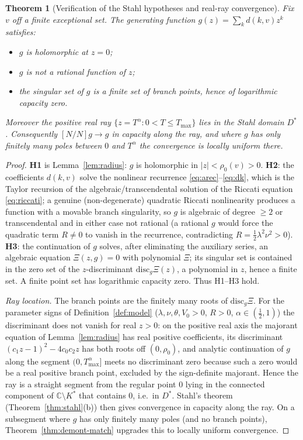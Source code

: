\documentclass[11pt]{article}
\newcommand{\C}{\mathbb{C}}
\theoremstyle{plain}
\newtheorem{theorem}{Theorem}[section]
\theoremstyle{definition}
\theoremstyle{remark}
\begin{document}
\begin{theorem}[Verification of the Stahl hypotheses and real-ray convergence]
\label{thm:stahl-ray}
Fix $v$ off a finite exceptional set. The generating function $g(z)=\sum_k
d(k,v)z^k$ satisfies:
\begin{itemize}[leftmargin=1.4em]
\item[\textbf{H1}] $g$ is holomorphic at $z=0$;
\item[\textbf{H2}] $g$ is not a rational function of $z$;
\item[\textbf{H3}] the singular set of $g$ is a finite set of branch points, hence
of logarithmic capacity zero.
\end{itemize}
Moreover the positive real ray $\{z=T^\alpha:0<T\le T_{\max}\}$ lies in the Stahl
domain $D^\ast$. Consequently $[N/N]g\to g$ in capacity along the ray, and where
$g$ has only finitely many poles between $0$ and $T^\alpha$ the convergence is
locally uniform there.
\end{theorem}
\begin{proof}
\textbf{H1} is Lemma~\ref{lem:radius}: $g$ is holomorphic in $|z|<\rho_0(v)>0$.
\textbf{H2}: the coefficients $d(k,v)$ solve the nonlinear
recurrence \eqref{eq:arec}--\eqref{eq:dk}, which is the Taylor recursion of the
algebraic/transcendental solution of the Riccati equation \eqref{eq:riccati}; a
genuine (non-degenerate) quadratic Riccati nonlinearity produces a function with a
movable branch singularity, so $g$ is algebraic of degree $\ge2$ or transcendental
and in either case not rational (a rational $g$ would force the quadratic term
$R\neq0$ to vanish in the recurrence, contradicting $R=\tfrac12\lambda^2\nu^2>0$).
\textbf{H3}: the continuation of $g$ solves, after eliminating the auxiliary
series, an algebraic equation $\Xi(z,g)=0$ with polynomial $\Xi$; its singular set
is contained in the zero set of the $z$-discriminant $\mathrm{disc}_g\Xi(z)$, a
polynomial in $z$, hence a finite set. A finite point set has logarithmic capacity
zero. Thus H1--H3 hold.

\emph{Ray location.} The branch points are the finitely many roots of
$\mathrm{disc}_g\Xi$. For the parameter signs of Definition~\ref{def:model}
($\lambda,\nu,\theta,V_0>0$, $R>0$, $\alpha\in(\tfrac12,1)$) the discriminant does
not vanish for real $z>0$: on the positive real axis the majorant equation of
Lemma~\ref{lem:radius} has real positive coefficients, its discriminant
$(c_1z-1)^2-4c_0c_2z$ has both roots off $(0,\rho_0)$, and analytic continuation of
$g$ along the segment $(0,T_{\max}^\alpha]$ meets no discriminant zero because such
a zero would be a real positive branch point, excluded by the sign-definite
majorant. Hence the ray is a straight segment from the regular point $0$ lying in
the connected component of $\C\setminus K^\ast$ that contains $0$, i.e.\ in
$D^\ast$. Stahl's theorem (Theorem~\ref{thm:stahl}(b)) then gives convergence in
capacity along the ray. On a subsegment where $g$ has only finitely many poles
(and no branch points), Theorem~\ref{thm:demont-match} upgrades this to locally
uniform convergence.
\end{proof}
\end{document}
